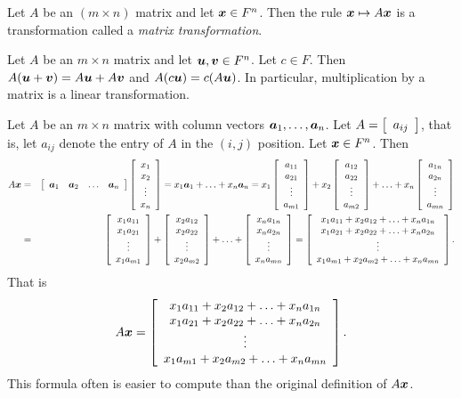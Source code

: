 Let $A$ be an $(m\times n)$ matrix and let $\bb x\in F^n$. Then the rule $\bb x \mapsto A\bb x$ is a transformation called a \emph{matrix transformation}.\\


\begin{Thm} Let $A$ be an $m\times n$ matrix and let $\bb u, \bb v \in F^n$. Let $c\in F$. Then $A(\bb u+\bb v) = A\bb u+A\bb v$ and $A(c\bb u) = c(A\bb u)$. In particular, multiplication by a matrix is a linear transformation.\end{Thm}\vs

Let $A$ be an $m\times n$ matrix with column vectors $\bb a_1, \ldots, \bb a_n$. Let $A  = \mtx{r}{a_{ij}}$, that is, let $a_{ij}$ denote the entry of $A$ in the $(i,j)$ position. Let $\bb x\in F^n$. Then 
\begin{eqnarray*}A\bb x &=& \mtx{rrrr}{\bb a_1 & \bb a_2 & \ldots & \bb a_n}\mtx{c}{x_1\\ x_2 \\ \vdots\\x_n} = x_1\bb a_1 + \ldots + x_n\bb a_n = x_1\mtx{c}{a_{11}\\ a_{21} \\ \vdots \\ a_{m1}} +  x_2\mtx{c}{a_{12}\\ a_{22} \\ \vdots \\ a_{m2}} + \ldots +  x_n\mtx{c}{a_{1n}\\ a_{2n} \\ \vdots \\ a_{mn}}\\ &=& \mtx{c}{x_1a_{11}\\ x_1a_{21} \\ \vdots \\ x_1a_{m1}} +  \mtx{c}{x_2a_{12}\\ x_2a_{22} \\ \vdots \\ x_2a_{m2}} + \ldots +  \mtx{c}{x_na_{1n}\\ x_na_{2n} \\ \vdots \\ x_na_{mn}} = \mtx{c}{x_1a_{11} + x_2a_{12} + \ldots + x_na_{1n}\\ x_1a_{21} + x_2a_{22} + \ldots + x_na_{2n}\\\vdots\\  x_1a_{m1} + x_2a_{m2} + \ldots + x_na_{mn}}.
\end{eqnarray*} That is \begin{equation} A\bb x = \mtx{c}{x_1a_{11} + x_2a_{12} + \ldots + x_na_{1n}\\ x_1a_{21} + x_2a_{22} + \ldots + x_na_{2n}\\\vdots\\  x_1a_{m1} + x_2a_{m2} + \ldots + x_na_{mn}}.\end{equation} This formula often is easier to compute than the original definition of $A \bb x$.\\

